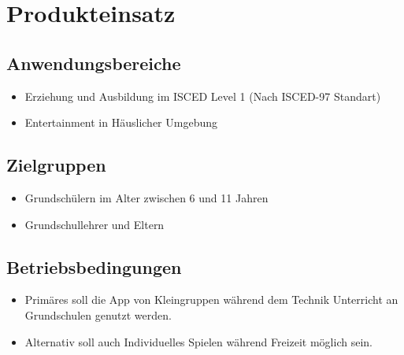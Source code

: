 \section{Produkteinsatz}

\subsection{Anwendungsbereiche}
\begin{itemize}
	\item Erziehung und Ausbildung im ISCED Level 1 (Nach ISCED-97 Standart)
	\item Entertainment in Häuslicher Umgebung
\end{itemize}


\subsection{Zielgruppen}

\begin{itemize}
	\item Grundschülern im Alter zwischen 6 und 11 Jahren
	\item Grundschullehrer und Eltern
\end{itemize}

\subsection{Betriebsbedingungen}
\begin{itemize}
	\item Primäres soll die App von Kleingruppen während dem Technik Unterricht an Grundschulen genutzt werden.
	\item Alternativ soll auch Individuelles Spielen während Freizeit möglich sein.
\end{itemize}
